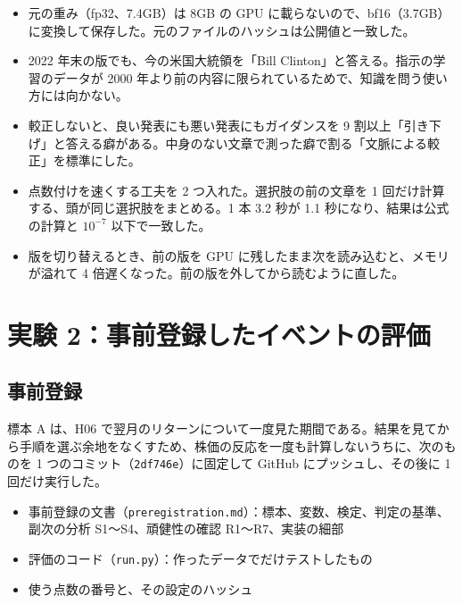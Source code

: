 \documentclass[xelatex,ja=standard,jafont=haranoaji,a4paper,10pt]{bxjsreport}
\newcommand{\code}[1]{\texttt{#1}}
\begin{document}
\begin{itemize}
\item 元の重み（fp32、7.4GB）は 8GB の GPU に載らないので、bf16（3.7GB）に変換して保存した。元のファイルのハッシュは公開値と一致した。
\item 2022 年末の版でも、今の米国大統領を「Bill Clinton」と答える。指示の学習のデータが 2000 年より前の内容に限られているためで、知識を問う使い方には向かない。
\item 較正しないと、良い発表にも悪い発表にもガイダンスを 9 割以上「引き下げ」と答える癖がある。中身のない文章で測った癖で割る「文脈による較正」を標準にした。
\item 点数付けを速くする工夫を 2 つ入れた。選択肢の前の文章を 1 回だけ計算する、頭が同じ選択肢をまとめる。1 本 3.2 秒が 1.1 秒になり、結果は公式の計算と $10^{-7}$ 以下で一致した。
\item 版を切り替えるとき、前の版を GPU に残したまま次を読み込むと、メモリが溢れて 4 倍遅くなった。前の版を外してから読むように直した。
\end{itemize}

\part{実験 2：事前登録したイベントの評価}

\chapter{事前登録}\label{ch:prereg}

標本 A は、H06 で翌月のリターンについて一度見た期間である。結果を見てから手順を選ぶ余地をなくすため、株価の反応を一度も計算しないうちに、次のものを 1 つのコミット（\code{2df746e}）に固定して GitHub にプッシュし、その後に 1 回だけ実行した。

\begin{itemize}
\item 事前登録の文書（\code{preregistration.md}）：標本、変数、検定、判定の基準、副次の分析 S1〜S4、頑健性の確認 R1〜R7、実装の細部
\item 評価のコード（\code{run.py}）：作ったデータでだけテストしたもの
\item 使う点数の番号と、その設定のハッシュ
\end{itemize}
\end{document}
